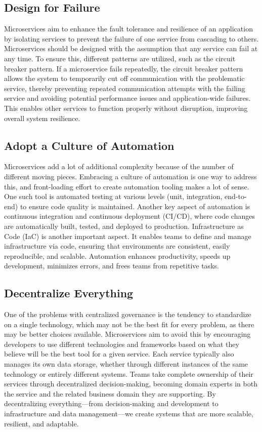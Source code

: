 \subsection{Design for Failure}
Microservices aim to enhance the fault tolerance and resilience of an application by isolating services to prevent the failure of one service from cascading to others. Microservices should be designed with the assumption that any service can fail at any time. To ensure this, different patterns are utilized, such as the circuit breaker pattern. If a microservice fails repeatedly, the circuit breaker pattern allows the system to temporarily cut off communication with the problematic service, thereby preventing repeated communication attempts with the failing service and avoiding potential performance issues and application-wide failures. This enables other services to function properly without disruption, improving overall system resilience.

\subsection{Adopt a Culture of Automation}
Microservices add a lot of additional complexity because of the number of different moving pieces. Embracing a culture of automation is one way to address this, and front-loading effort to create automation tooling makes a lot of sense. One such tool is automated testing at various levels (unit, integration, end-to-end) to ensure code quality is maintained. Another key aspect of automation is continuous integration and continuous deployment (CI/CD), where code changes are automatically built, tested, and deployed to production. Infrastructure as Code (IaC) is another important aspect. It enables teams to define and manage infrastructure via code, ensuring that environments are consistent, easily reproducible, and scalable. Automation enhances productivity, speeds up development, minimizes errors, and frees teams from repetitive tasks.

\subsection{Decentralize Everything}
One of the problems with centralized governance is the tendency to standardize on a single technology, which may not be the best fit for every problem, as there may be better choices available. Microservices aim to avoid this by encouraging developers to use different technologies and frameworks based on what they believe will be the best tool for a given service. Each service typically also manages its own data storage, whether through different instances of the same technology or entirely different systems. Teams take complete ownership of their services through decentralized decision-making, becoming domain experts in both the service and the related business domain they are supporting. By decentralizing everything—from decision-making and development to infrastructure and data management—we create systems that are more scalable, resilient, and adaptable.

